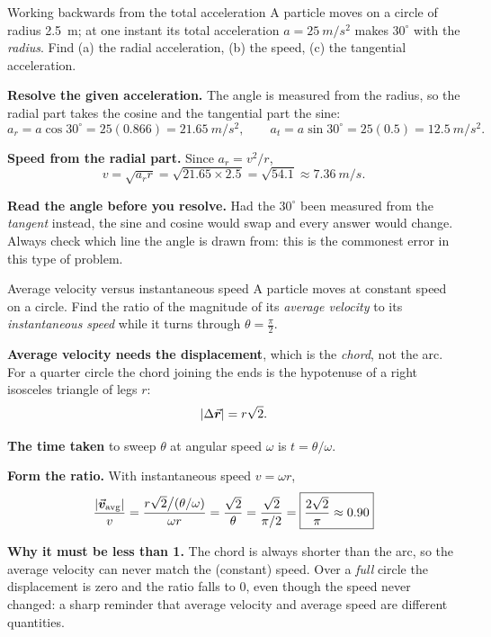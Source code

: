 \begin{exbox}{Working backwards from the total acceleration}
A particle moves on a circle of radius \SI{2.5}{m}; at one instant its total acceleration
$a=\SI{25}{m/s^2}$ makes $30^\circ$ with the \emph{radius}. Find (a) the radial acceleration, (b) the
speed, (c) the tangential acceleration.

 \textbf{Resolve the given acceleration.} The angle is measured from the radius, so the radial
part takes the cosine and the tangential part the sine:
\[
a_r=a\cos30^\circ=25(0.866)=\SI{21.65}{m/s^2},
\qquad
a_t=a\sin30^\circ=25(0.5)=\SI{12.5}{m/s^2}.
\]

 \textbf{Speed from the radial part.} Since $a_r=v^{2}/r$,
\[
v=\sqrt{a_r r}=\sqrt{21.65\times2.5}=\sqrt{54.1}\approx\SI{7.36}{m/s}.
\]

\smallskip
\textbf{Read the angle before you resolve.} Had the $30^\circ$ been measured from the \emph{tangent}
instead, the sine and cosine would swap and every answer would change. Always check which line the
angle is drawn from: this is the commonest error in this type of problem.
\end{exbox}

\begin{exbox}{Average velocity versus instantaneous speed}
A particle moves at constant speed on a circle. Find the ratio of the magnitude of its \emph{average
velocity} to its \emph{instantaneous speed} while it turns through $\theta=\tfrac{\pi}{2}$.

 \textbf{Average velocity needs the displacement}, which is the \emph{chord}, not the arc. For
a quarter circle the chord joining the ends is the hypotenuse of a right isosceles triangle of legs
$r$:
\[
|\Delta\vec{\bm{r}}|=r\sqrt2.
\]

 \textbf{The time taken} to sweep $\theta$ at angular speed $\omega$ is $t=\theta/\omega$.

 \textbf{Form the ratio.} With instantaneous speed $v=\omega r$,
\[
\frac{|\vec{\bm{v}}_{\text{avg}}|}{v}
=\frac{r\sqrt2\big/(\theta/\omega)}{\omega r}
=\frac{\sqrt2}{\theta}
=\frac{\sqrt2}{\pi/2}
=\boxed{\frac{2\sqrt2}{\pi}\approx0.90}
\]

 \textbf{Why it must be less than 1.} The chord is always shorter than the arc, so the average
velocity can never match the (constant) speed. Over a \emph{full} circle the displacement is zero and
the ratio falls to $0$, even though the speed never changed: a sharp reminder that average velocity and
average speed are different quantities. 
\end{exbox}

